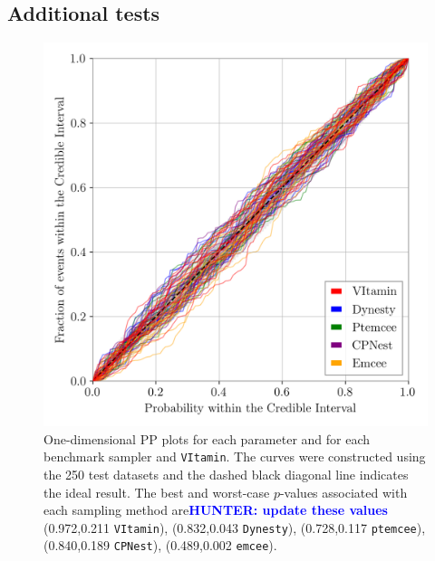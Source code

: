 \documentclass[%
showpacs,
nofootinbib,
 amsmath,amssymb,
 aps,
 twocolumn,
 prl,
 reprint,
floatfix,
]{revtex4-1}
\newcommand{\hunter}[1]{\textbf{\textcolor{blue}{HUNTER: #1}}}
\begin{document}
\subsection{Additional tests}
%
%
\begin{figure}
    \includegraphics[width=\columnwidth]{latest_pp_plot.png}
    \caption{\label{fig:pp_plot} One-dimensional \ac{PP} plots for each
parameter and for each benchmark sampler and \texttt{VItamin}. The curves were
constructed using the 250 test datasets and the dashed black diagonal line
indicates the ideal result. The best and worst-case $p$-values associated with each
sampling method are\hunter{update these values} (0.972,0.211 \texttt{VItamin}), (0.832,0.043 \texttt{Dynesty}), (0.728,0.117
\texttt{ptemcee}), (0.840,0.189 \texttt{CPNest}), (0.489,0.002 \texttt{emcee}). 
}
\end{figure}
%
\end{document}

